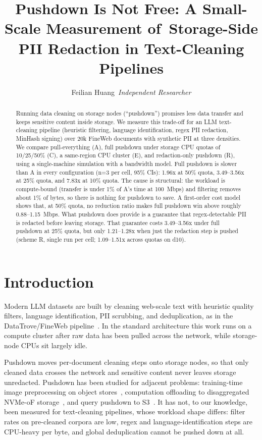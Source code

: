 \documentclass[11pt]{article}
\title{Pushdown Is Not Free: A Small-Scale Measurement of\ Storage-Side PII Redaction in Text-Cleaning Pipelines}
\author{Feilian Huang\ \textit{Independent Researcher}}
\date{}
\begin{document}
\maketitle

\begin{abstract}
Running data cleaning on storage nodes (``pushdown'') promises less data transfer and keeps sensitive content inside storage. We measure this trade-off for an LLM text-cleaning pipeline (heuristic filtering, language identification, regex PII redaction, MinHash signing) over 20k FineWeb documents with synthetic PII at three densities. We compare pull-everything (A), full pushdown under storage CPU quotas of 10/25/50\% (C), a same-region CPU cluster (E), and redaction-only pushdown (R), using a single-machine simulation with a bandwidth model. Full pushdown is slower than A in every configuration (n=3 per cell, 95\% CIs): 1.96x at 50\% quota, 3.49--3.56x at 25\% quota, and 7.83x at 10\% quota. The cause is structural: the workload is compute-bound (transfer is under 1\% of A's time at 100~Mbps) and filtering removes about 1\% of bytes, so there is nothing for pushdown to save. A first-order cost model shows that, at 50\% quota, no reduction ratio makes full pushdown win above roughly 0.88--1.15~Mbps. What pushdown does provide is a guarantee that regex-detectable PII is redacted before leaving storage. That guarantee costs 3.49--3.56x under full pushdown at 25\% quota, but only 1.21--1.28x when just the redaction step is pushed (scheme R, single run per cell; 1.09--1.51x across quotas on d10).
\end{abstract}

\section{Introduction}

Modern LLM datasets are built by cleaning web-scale text with heuristic quality filters, language identification, PII scrubbing, and deduplication, as in the DataTrove/FineWeb pipeline~\cite{penedo2024fineweb}. In the standard architecture this work runs on a compute cluster after raw data has been pulled across the network, while storage-node CPUs sit largely idle.

Pushdown moves per-document cleaning steps onto storage nodes, so that only cleaned data crosses the network and sensitive content never leaves storage unredacted. Pushdown has been studied for adjacent problems: training-time image preprocessing on object stores~\cite{petrescu2024hapi,wang2024sophon}, computation offloading to disaggregated NVMe-oF storage~\cite{moon2026offloadfs}, and query pushdown to S3~\cite{yu2020pushdowndb,yang2021flexpushdowndb}. It has not, to our knowledge, been measured for text-cleaning pipelines, whose workload shape differs: filter rates on pre-cleaned corpora are low, regex and language-identification steps are CPU-heavy per byte, and global deduplication cannot be pushed down at all.
\end{document}
